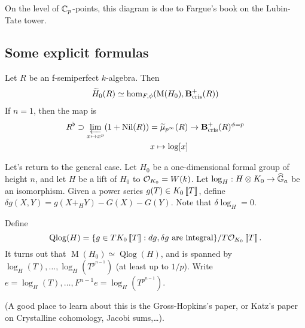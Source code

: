 On the level of $\mathbb{C}_p$-points, this diagram is due to Fargue's book on the 
Lubin-Tate tower. 





\subsection{Some explicit formulas}

Let $R$ be an f-semiperfect $k$-algebra. Then 
\begin{align*}
  \widetilde H_0(R) \simeq \hom_{F,\phi}(\operatorname M(H_0),\mathbf{B}_\textnormal{cris}^+(R)) 
\end{align*}
If $n=1$, then the map is 
\begin{align*}
  R^\flat\supset \varprojlim_{x\mapsto x^p} (1+\operatorname{Nil}(R)) =\widetilde \mu_{p^\infty}(R) &\to \mathbf{B}_\textnormal{cris}^+(R)^{\phi=p}  \\
  x\mapsto \log[x] 
\end{align*}

Let's return to the general case. Let $H_0$ be a one-dimensional formal group of 
height $n$, and let $H$ be a lift of $H_0$ to $\mathcal{O}_{K_0}=W(k)$. Let 
$\log_H:H\otimes K_0 \to \widehat{\mathbb{G}}_a$ be an isomorphism. Given a power series 
$g(T)\in K_0\left\llbracket {T} \right\rrbracket$, define $\delta g(X,Y) = g(X+_H Y)-G(X)-G(Y)$. Note 
that $\delta\log_H=0$. 

Define 
\[
  \operatorname{Qlog}(H)=\{g\in T K_0\left\llbracket {T} \right\rrbracket:d g,\delta g\text{ are integral}\} / T\mathcal{O}_{K_0}\left\llbracket {T} \right\rrbracket .
\]
It turns out that $\operatorname M(H_0) \simeq \operatorname{Qlog}(H)$, and is 
spanned by $\log_H(T),\dots,\log_H(T^{p^{n-1}})$ (at least up to 
$1/p$). Write $e=\log_H(T),\dots,F^{n-1} e=\log_H(T^{p^{n-1}})$.  

(A good place to learn about this is the Gross-Hopkins's paper, or Katz's 
paper on Crystalline cohomology, Jacobi sums,\ldots). 

